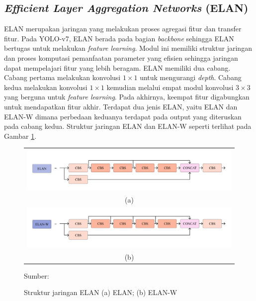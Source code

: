     \subsection{\textit{Efficient Layer Aggregation Networks} (ELAN)}
    ELAN merupakan jaringan yang melakukan proses agregasi fitur dan transfer fitur. Pada YOLO-v7, ELAN berada pada bagian \textit{backbone} sehingga ELAN bertugas untuk melakukan \textit{feature learning}. Modul ini memiliki struktur jaringan dan proses komputasi pemanfaatan parameter yang efisien sehingga jaringan dapat mempelajari fitur yang lebih beragam. ELAN memiliki dua cabang. Cabang pertama melakukan konvolusi $1\times 1$ untuk mengurangi \textit{depth}. Cabang kedua melakukan konvolusi $1\times 1$ kemudian melalui empat modul konvolusi $3\times 3$ yang berguna untuk \textit{feature learning}. Pada akhirnya, keempat fitur digabungkan untuk mendapatkan fitur akhir. Terdapat dua jenis ELAN, yaitu ELAN dan ELAN-W dimana perbedaan keduanya terdapat pada output yang diteruskan pada cabang kedua. Struktur jaringan ELAN dan ELAN-W seperti terlihat pada Gambar \ref{fig:elan}.

    \begin{figure}[H]
        \centering
        \begin{tabular}{c}
            \includegraphics[width=13cm]{img/bab2/elan.png}\\
            (a)\\
            \includegraphics[width=13cm]{img/bab2/elan-w.png}\\
            (b)\\
        \end{tabular}
        \caption{Struktur jaringan ELAN (a) ELAN; (b) ELAN-W}
        \label{fig:elan}
        Sumber: \citep{Wang2022}
    \end{figure}

